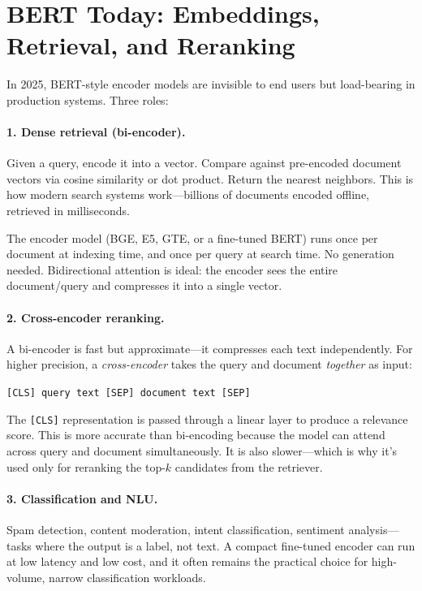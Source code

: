 \section{BERT Today: Embeddings, Retrieval, and Reranking}
\label{sec:bert-today}

In 2025, BERT-style encoder models are invisible to end users but load-bearing in production systems. Three roles:

\paragraph{1. Dense retrieval (bi-encoder).} Given a query, encode it into a vector. Compare against pre-encoded document vectors via cosine similarity or dot product. Return the nearest neighbors. This is how modern search systems work---billions of documents encoded offline, retrieved in milliseconds.

The encoder model (BGE, E5, GTE, or a fine-tuned BERT) runs once per document at indexing time, and once per query at search time. No generation needed. Bidirectional attention is ideal: the encoder sees the entire document/query and compresses it into a single vector.

\paragraph{2. Cross-encoder reranking.} A bi-encoder is fast but approximate---it compresses each text independently. For higher precision, a \emph{cross-encoder} takes the query and document \emph{together} as input:

\begin{center}
\texttt{[CLS] query text [SEP] document text [SEP]}
\end{center}

The \texttt{[CLS]} representation is passed through a linear layer to produce a relevance score. This is more accurate than bi-encoding because the model can attend across query and document simultaneously. It is also slower---which is why it's used only for reranking the top-$k$ candidates from the retriever.

\paragraph{3. Classification and NLU.} Spam detection, content moderation, intent classification, sentiment analysis---tasks where the output is a label, not text. A compact fine-tuned encoder can run at low latency and low cost, and it often remains the practical choice for high-volume, narrow classification workloads.

